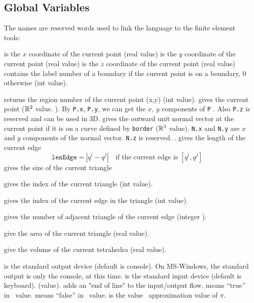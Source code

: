 \documentclass[a4paper,twoside,12pt]{book}
\begin{document}
\subsection{Global Variables}\label{sec:Global}
 The names  are reserved words used to link
the language to the finite element tools:
\begin{description}
    \itemtt[x]  is the $x$ coordinate of the current point (real value) 
    \itemtt[y]  is the $y$ coordinate  of the current point (real value) 
    \itemtt[z]  is the $z$ coordinate of the current point (real value) 
\itemtt[label] contains the label number of a boundary if the  current point is
on a boundary, 0 otherwise  (int value). 
    \item[region]   returns the region number of  the current point (x,y) (int value). 
\itemtt[P]  gives the  current point  ($\mathbb{R}^{2}$ value. ).
By \texttt{P.x}, \texttt{P.y}, we can get the $x,\, y$ components of \texttt{P} .
Also \texttt{P.z} is reserved and can be used in 3D.
    \itemtt[N]  gives the outward unit normal vector at the  current point if it is on a
     curve defined by \texttt{border} ($\mathbb{R}^{3}$ value).
\texttt{N.x} and \texttt{N.y} are $x$ and $y$ components of the normal vector.
\texttt{N.z} is reserved. .
    \itemtt[lenEdge] gives the length of the current edge\\
    \[
    \texttt{lenEdge} = |q^i-q^j|\quad \textrm{if the current edge is }[q^i,q^j]
    \]
    \itemtt[hTriangle] gives the size of the current triangle 

    \itemtt[nuTriangle] gives the index of the current triangle (int value).

    \itemtt[nuEdge]  gives the index of the current edge in the triangle (int value).

    \itemtt[nTonEdge] gives the number of adjacent triangle of the current
    edge (integer ).

    \itemtt[area] give the area of the current triangle (real value). 

    \itemtt[volume] give the volume of the current tetrahedra (real value). 

\itemtt[cout]  is the standard output device (default is console).
On MS-Windows, the standard output is only the console, at this time.
  \Ostream {}
\itemtt[cin]  is the standard input device (default is keyboard). (\Istream value). 
\itemtt[endl] adds an "end of line" to the input/output flow.
\itemtt[true]   means ``true'' in  \Bool\  value. 
\itemtt[false]  means ``false'' in  \Bool\ value. 
\itemtt[pi]   is the \Real value  ~approximation value of $\pi$.
\end{description}
\end{document}
